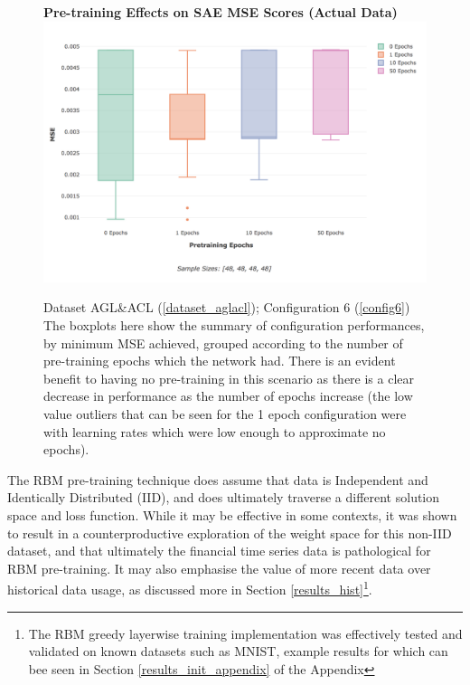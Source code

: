\documentclass[a4paper,11pt,oneside]{article}
\theoremstyle{plain}
\theoremstyle{definition}
\begin{document}
	\begin{figure}[H]
		\centering
		\textbf{Pre-training Effects on SAE MSE Scores (Actual Data)} 
		\includegraphics[scale=0.45]{images/results/newinit/actual_sigmoid_pt.png}
		\caption[Pre-training Effects on SAE MSE Scores (Actual Data)]{Dataset AGL\&ACL (\ref{dataset_aglacl}); Configuration 6 (\ref{config6})
			\newline \newline The boxplots here show the summary of configuration performances, by minimum MSE achieved, grouped according to the number of pre-training epochs which the network had. There is an evident benefit to having no pre-training in this scenario as there is a clear decrease in performance as the number of epochs increase (the low value outliers that can be seen for the 1 epoch configuration were with learning rates which were low enough to approximate no epochs).}
		\label{figure-results-pretraining-effect}
	\end{figure}		
	
	The RBM pre-training technique does assume that data is Independent and Identically Distributed (IID), and does ultimately traverse a different solution space and loss function. While it may be effective in some contexts, it was shown to result in a counterproductive exploration of the weight space for this non-IID dataset, and that ultimately the financial time series data is pathological for RBM pre-training. It may also emphasise the value of more recent data over historical data usage, as discussed more in Section \ref{results_hist}\footnote{The RBM greedy layerwise training implementation was effectively tested and validated on known datasets such as MNIST, example results for which can bee seen in Section \ref{results_init_appendix} of the Appendix}.\newline 
	
\end{document}
